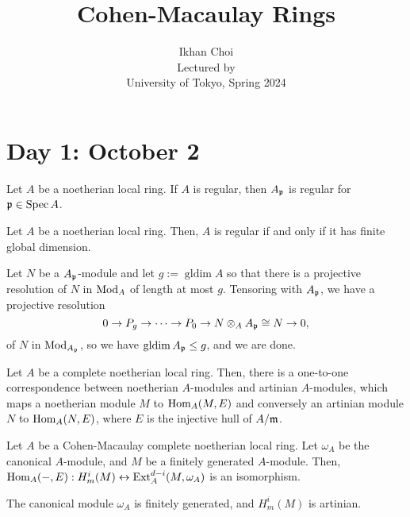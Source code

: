 \documentclass{../../../small}
\newcommand{\gldim}{\operatorname{gldim}}
\begin{document}
\title{Cohen-Macaulay Rings}
\author{Ikhan Choi\\Lectured by \\University of Tokyo, Spring 2024}
\maketitle

\newpage
\section{Day 1: October 2}

\begin{thm*}[0.1]
Let $A$ be a noetherian local ring.
If $A$ is regular, then $A_{\mathfrak{p}}$ is regular for $\mathfrak{p}\in\operatorname{Spec} A$.
\end{thm*}

\begin{thm*}
Let $A$ be a noetherian local ring.
Then, $A$ is regular if and only if it has finite global dimension.
\end{thm*}

\begin{pf}
Let $N$ be a $A_{\mathfrak{p}}$-module and let $g:=\gldim A$ so that there is a projective resolution of $N$ in $\operatorname{Mod}_A$ of length at most $g$.
Tensoring with $A_{\mathfrak{p}}$, we have a projective resolution
\[0\to P_g\to\cdots\to P_0\to N\otimes_AA_{\mathfrak{p}}\cong N\to0,\]
of $N$ in $\operatorname{Mod}_{A_{\mathfrak{p}}}$, so we have $\gldim A_\fp\le g$, and we are done.
\end{pf}

\begin{thm*}
Let $A$ be a complete noetherian local ring.
Then, there is a one-to-one correspondence between noetherian $A$-modules and artinian $A$-modules, which maps a noetherian module $M$ to $\operatorname{Hom}_A(M,E)$ and conversely an artinian module $N$ to $\operatorname{Hom}_A(N,E)$, where $E$ is the injective hull of $A/\mathfrak{m}$.
\end{thm*}

\begin{thm*}
Let $A$ be a Cohen-Macaulay complete noetherian local ring.
Let $\omega_A$ be the canonical $A$-module, and $M$ be a finitely generated $A$-module.
Then, $\operatorname{Hom}_A(-,E):H_m^i(M)\leftrightarrow\operatorname{Ext}_A^{d-i}(M,\omega_A)$ is an isomorphism.
\end{thm*}
\begin{rmk*}
The canonical module $\omega_A$ is finitely generated, and $H_m^i(M)$ is artinian.
\end{rmk*}
\end{document}
